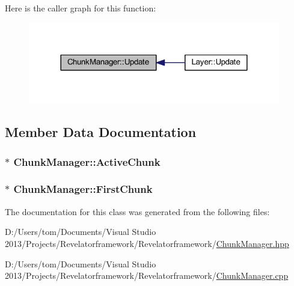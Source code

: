 Here is the caller graph for this function\-:\nopagebreak
\begin{figure}[H]
\begin{center}
\leavevmode
\includegraphics[width=312pt]{class_chunk_manager_a601244f4c4a114fe2a646e4b5ad32a6e_icgraph}
\end{center}
\end{figure}




\subsection{Member Data Documentation}
\hypertarget{class_chunk_manager_a8008f62926fe10f46ac59001aae2d372}{
\subsubsection[{Active\-Chunk}]{$\ast$ Chunk\-Manager\-::\-Active\-Chunk\hspace{0.3cm}{\ttfamily [private]}}}\label{class_chunk_manager_a8008f62926fe10f46ac59001aae2d372}
\hypertarget{class_chunk_manager_afb87cd5dd3cb61f09a6038d1796719ba}{
\subsubsection[{First\-Chunk}]{$\ast$ Chunk\-Manager\-::\-First\-Chunk\hspace{0.3cm}{\ttfamily [private]}}}\label{class_chunk_manager_afb87cd5dd3cb61f09a6038d1796719ba}


The documentation for this class was generated from the following files\-:\begin{DoxyCompactItemize}
\item 
D\-:/\-Users/tom/\-Documents/\-Visual Studio 2013/\-Projects/\-Revelatorframework/\-Revelatorframework/\hyperlink{_chunk_manager_8hpp}{Chunk\-Manager.\-hpp}\item 
D\-:/\-Users/tom/\-Documents/\-Visual Studio 2013/\-Projects/\-Revelatorframework/\-Revelatorframework/\hyperlink{_chunk_manager_8cpp}{Chunk\-Manager.\-cpp}\end{DoxyCompactItemize}
